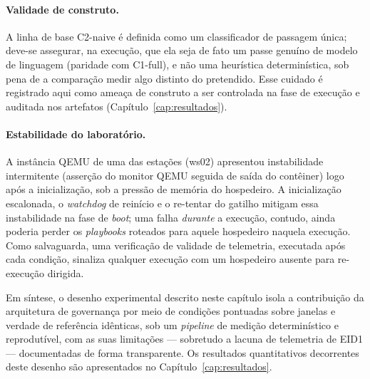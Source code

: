 \paragraph{Validade de construto.} A linha de base C2-naive é definida como um
classificador de passagem única; deve-se assegurar, na execução, que ela seja de
fato um passe genuíno de modelo de linguagem (paridade com C1-full), e não uma
heurística determinística, sob pena de a comparação medir algo distinto do
pretendido. Esse cuidado é registrado aqui como ameaça de construto a ser
controlada na fase de execução e auditada nos artefatos (Capítulo~\ref{cap:resultados}).

\paragraph{Estabilidade do laboratório.} A instância QEMU de uma das estações
(ws02) apresentou instabilidade intermitente (asserção do monitor QEMU seguida de
saída do contêiner) logo após a inicialização, sob a pressão de memória do
hospedeiro. A inicialização escalonada, o \textit{watchdog} de reinício e o
re-tentar do gatilho mitigam essa instabilidade na fase de \textit{boot}; uma
falha \emph{durante} a execução, contudo, ainda poderia perder os
\textit{playbooks} roteados para aquele hospedeiro naquela execução. Como
salvaguarda, uma verificação de validade de telemetria, executada após cada
condição, sinaliza qualquer execução com um hospedeiro ausente para
re-execução dirigida.

\bigskip
\noindent
Em síntese, o desenho experimental descrito neste capítulo isola a contribuição
da arquitetura de governança por meio de condições pontuadas sobre janelas e
verdade de referência idênticas, sob um \textit{pipeline} de medição
determinístico e reprodutível, com as suas limitações --- sobretudo a lacuna de
telemetria de EID1 --- documentadas de forma transparente. Os resultados
quantitativos decorrentes deste desenho são apresentados no
Capítulo~\ref{cap:resultados}.
